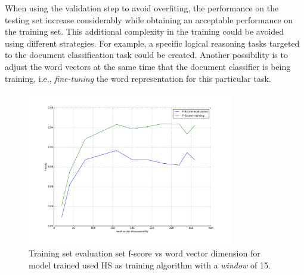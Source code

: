 When using the validation step to avoid overfiting, the performance on the
testing set increase considerably while obtaining an acceptable performance
on the training set. This additional complexity in the training could be
avoided using different strategies. For example, a specific logical reasoning tasks
targeted to the document classification task could be created. Another possibility is to
adjust the word vectors at the same time that the document classifier is
being training, i.e.,  \textit{fine-tuning} the word representation for this
particular task.


\begin{figure}[!h]
    \centering
    \includegraphics[width=0.80\textwidth]{images/005-fscore-vs-training-size.pdf}
    \caption{Training set  evaluation set f-score vs word vector dimension
      for model trained used \ac{HS} as training algorithm with a \textit{window} of 15.}
    \label{fig:fscore-vs-size-dmr}
\end{figure}









